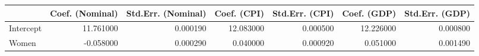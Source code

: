 \begin{tabular}{lrrrrrr}
\toprule
 & Coef. (Nominal) & Std.Err. (Nominal) & Coef. (CPI) & Std.Err. (CPI) & Coef. (GDP) & Std.Err. (GDP) \\
\midrule
Intercept & 11.761000 & 0.000190 & 12.083000 & 0.000500 & 12.226000 & 0.000800 \\
Women & -0.058000 & 0.000290 & 0.040000 & 0.000920 & 0.051000 & 0.001490 \\
\bottomrule
\end{tabular}
